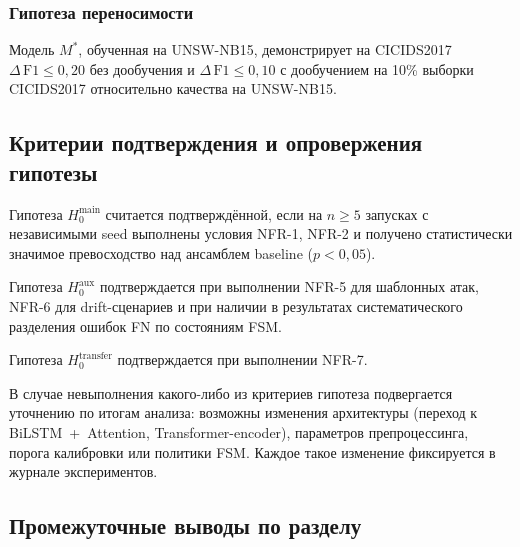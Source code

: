 \subsubsection{Гипотеза переносимости}

\begin{statement}
Модель \(M^*\), обученная на UNSW-NB15, демонстрирует на CICIDS2017
\(\Delta\,\text{F1} \leq 0{,}20\) без дообучения и
\(\Delta\,\text{F1} \leq 0{,}10\) с дообучением на 10\% выборки CICIDS2017
относительно качества на UNSW-NB15.
\end{statement}

\subsection{Критерии подтверждения и опровержения гипотезы}

Гипотеза \(H_0^{\text{main}}\) считается подтверждённой, если на
\(n \geq 5\) запусках с независимыми seed выполнены условия NFR-1, NFR-2 и
получено статистически значимое превосходство над ансамблем baseline
(\(p < 0{,}05\)).

Гипотеза \(H_0^{\text{aux}}\) подтверждается при выполнении NFR-5 для
шаблонных атак, NFR-6 для drift-сценариев и при наличии в результатах
систематического разделения ошибок FN по состояниям FSM.

Гипотеза \(H_0^{\text{transfer}}\) подтверждается при выполнении NFR-7.

В случае невыполнения какого-либо из критериев гипотеза подвергается
уточнению по итогам анализа: возможны изменения архитектуры (переход к
BiLSTM~+~Attention, Transformer-encoder), параметров препроцессинга,
порога калибровки или политики FSM. Каждое такое изменение фиксируется в
журнале экспериментов.

\subsection{Промежуточные выводы по разделу}

